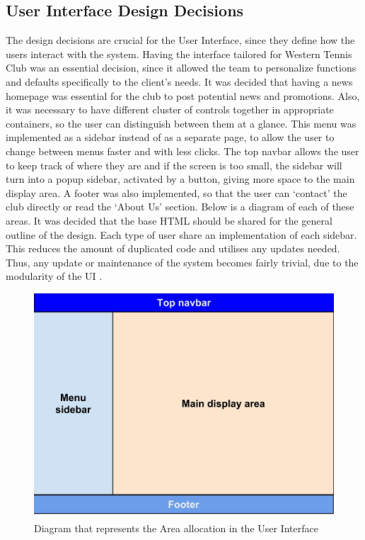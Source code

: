 \documentclass{l3proj}
\begin{document}
\subsection{User Interface Design Decisions}
The design decisions are crucial for the User Interface, since they define how the users interact with the system. Having the interface tailored for Western Tennis Club was an essential decision, since it allowed the team to personalize functions and defaults specifically to the client's needs. It was decided that having a news homepage was essential for the club to post potential news and promotions. Also, it was necessary to have different cluster of controls together in appropriate containers, so the user can distinguish between them at a glance. This menu was implemented as a sidebar instead of as a separate page, to allow the user to change between menus faster and with less clicks. The top navbar allows the user to keep track of where they are and if the screen is too small, the sidebar will turn into a popup sidebar, activated by a button, giving more space to the main display area. A footer was also implemented, so that the user can `contact' the club directly or read the `About Us' section. Below is a diagram of each of these areas. It was decided that the base HTML should be shared for the general outline of the design. Each type of user share an implementation of each sidebar. This reduces the amount of duplicated code and utilises any updates needed. Thus, any update or maintenance of the system becomes fairly trivial, due to the modularity of the UI \cite{software}.
{
\begin{figure}[h]
\caption{Diagram that represents the Area allocation in the User Interface}
\centering
\includegraphics[scale=0.20]{AreaDiagramTP3.jpg}
\end{figure}
}
\end{document}
